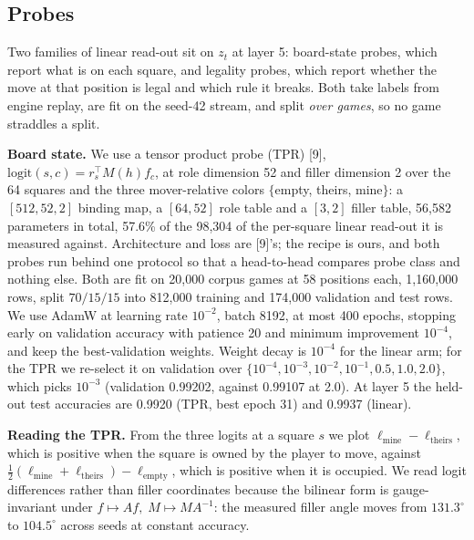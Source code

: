 \subsection{Probes}

Two families of linear read-out sit on $z_t$ at layer 5: board-state probes, which report what is
on each square, and legality probes, which report whether the move at that position is legal and
which rule it breaks. Both take labels from engine replay, are fit on the seed-42 stream, and
split \emph{over games}, so no game straddles a split.

\textbf{Board state.} We use a tensor product probe (TPR) [9],
$\mathrm{logit}(s, c) = r_s^\top M(h) f_c$, at role dimension 52 and filler dimension 2 over the
64 squares and the three mover-relative colors $\{$empty, theirs, mine$\}$: a $[512, 52, 2]$
binding map, a $[64, 52]$ role table and a $[3, 2]$ filler table, 56,582 parameters in total,
57.6\% of the 98,304 of the per-square linear read-out it is measured against. Architecture and loss are [9]'s; the recipe is ours, and both probes run behind one protocol so
that a head-to-head compares probe class and nothing else. Both are fit on 20,000 corpus games at
58 positions each, 1,160,000 rows, split $70/15/15$ into 812,000 training and 174,000 validation
and test rows. We use AdamW at learning rate $10^{-2}$, batch 8192, at most 400 epochs, stopping
early on validation accuracy with patience 20 and minimum improvement $10^{-4}$, and keep the
best-validation weights. Weight decay is $10^{-4}$ for the linear arm; for the TPR we re-select
it on validation over $\{10^{-4}, 10^{-3}, 10^{-2}, 10^{-1}, 0.5, 1.0, 2.0\}$, which picks
$10^{-3}$ (validation 0.99202, against 0.99107 at 2.0). At layer 5 the held-out test accuracies
are 0.9920 (TPR, best epoch 31) and 0.9937 (linear).

\textbf{Reading the TPR.} From the three logits at a square $s$ we plot $\ell_{\mathrm{mine}} -
\ell_{\mathrm{theirs}}$, which is positive when the square is owned by the player to move, against
$\tfrac{1}{2}(\ell_{\mathrm{mine}} + \ell_{\mathrm{theirs}}) - \ell_{\mathrm{empty}}$, which is positive when
it is occupied. We read logit differences rather than filler coordinates because the bilinear
form is gauge-invariant under $f \mapsto Af,\; M \mapsto MA^{-1}$: the measured filler angle
moves from $131.3^\circ$ to $104.5^\circ$ across seeds at constant accuracy.

